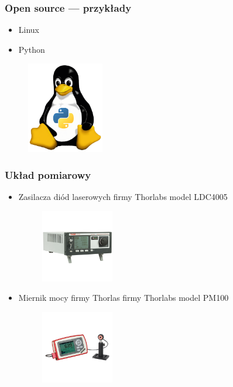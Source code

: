\documentclass[xcolor={dvipsnames,table}]{beamer}
\begin{document}
\begin{frame}
\frametitle{Open source --- przykłady}
\begin{itemize}
\item Linux 
\item Python
\end{itemize}

\begin{figure}
   \includegraphics[width=0.30\textwidth,natwidth=69,natheight=87]{tux-python.png}
\end{figure}
\end{frame}

\begin{frame}
\frametitle{Układ pomiarowy}
\begin{itemize}
\item Zasilacza diód laserowych firmy Thorlabs model LDC4005 
\begin{figure}
   \includegraphics[width=0.30\textwidth,natwidth=69,natheight=87]{ldc4005.jpg}
\end{figure}
\item Miernik mocy firmy Thorlas firmy Thorlabs model PM100
\begin{figure}
   \includegraphics[width=0.30\textwidth,natwidth=69,natheight=87]{pm100.jpg}
\end{figure}
\end{itemize}
\end{frame}
\end{document}
